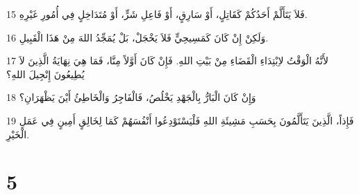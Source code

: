 \par 15 فَلاَ يَتَأَلَّمْ أَحَدُكُمْ كَقَاتِلٍ، أَوْ سَارِقٍ، أَوْ فَاعِلِ شَرٍّ، أَوْ مُتَدَاخِلٍ فِي أُمُورِ غَيْرِهِ.
\par 16 وَلَكِنْ إِنْ كَانَ كَمَسِيحِيٍّ فَلاَ يَخْجَلْ، بَلْ يُمَجِّدُ اللهَ مِنْ هَذَا الْقَبِيلِ.
\par 17 لأَنَّهُ الْوَقْتُ لاِبْتِدَاءِ الْقَضَاءِ مِنْ بَيْتِ اللهِ. فَإِنْ كَانَ أَوَّلاً مِنَّا، فَمَا هِيَ نِهَايَةُ الَّذِينَ لاَ يُطِيعُونَ إِنْجِيلَ اللهِ؟
\par 18 وَإِنْ كَانَ الْبَارُّ بِالْجَهْدِ يَخْلُصُ، فَالْفَاجِرُ وَالْخَاطِئُ أَيْنَ يَظْهَرَانِ؟
\par 19 فَإِذاً، الَّذِينَ يَتَأَلَّمُونَ بِحَسَبِ مَشِيئَةِ اللهِ فَلْيَسْتَوْدِعُوا أَنْفُسَهُمْ كَمَا لِخَالِقٍ أَمِينٍ فِي عَمَلِ الْخَيْرِ.

\chapter{5}

